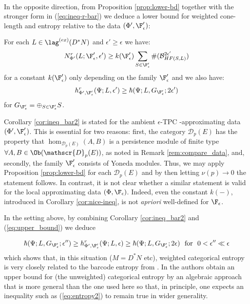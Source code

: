 \

In the opposite direction, from Proposition \ref{prop:lower-bd}  together with the stronger form in (\ref{eq:ineq-r-bar}) we deduce a lower bound for weighted cone-length and entropy relative to the data $(\Phi',\F'_{\epsilon})$:

\begin{cor} \label{cor:ineq_bar2} For each $L\in \lag^{(ex)}(D^{\ast}N)$ and $\epsilon'\geq \epsilon$ we 
have:
$$N^{r}_{\Phi'}(L;\F'_{\epsilon},\epsilon')\geq k(\F'_{\epsilon}) \sum_{S\in \F'_{\epsilon}} \#(\mathcal{B}^{2\epsilon'}_{HF(S,L)})$$
for a constant $k(\F'_{\epsilon})$  only depending on the family $\F'_{\epsilon}$ and we also have:
$$h^{r}_{\Phi',\F'_{\epsilon}}(\Psi; L ,\epsilon')\geq  \hbar(\Psi; L, G_{\F'_{\epsilon}}; 2\epsilon')$$ 
for $G_{\F'_{\epsilon}}=\oplus_{S\in \F'_{\epsilon}} S$.
\end{cor}
Corollary \ref{cor:ineq_bar2} is stated for the ambient $\epsilon$-TPC -approximating data $(\Phi',\F'_{\epsilon})$. This is essential for two reasons: first, the category  $\mathscr{D}_{p}(E)$ has the property that $\hom_{\mathscr{D}_{p}(E)}(A,B)$ is a persistence module of finite type $\forall A, B\in \Ob (\mathscr{D}_{p}(E))$, as noted in Remark  \ref{rem:compare_data}, and, secondly, the family $\F'_{\epsilon}$ consists of Yoneda modules. Thus, we may apply 
Proposition \ref{prop:lower-bd} for each $\mathscr{D}_{p}(E)$ 
and by then letting $\nu(p)\to 0$ the statement follows. In contrast,  it is not clear whether a similar statement is valid
for the local approximating data $(\Phi, \F_{\epsilon})$. Indeed, even the constant $k(-)$, introduced in Corollary \ref{cor:nice-ineq}, is not {\em apriori} well-defined for $\F_{\epsilon}$. 

\begin{rem}\label{rem:entrop_bars}
In the setting above,  by combining  Corollary \ref{cor:ineq_bar2}
and (\ref{eq:upper_bound}) we deduce

\begin{equation}\label{eq:entropy2}\hbar(\Psi; L, G_{\F'_{\epsilon}}; \epsilon'') \geq h^{r}_{\Phi',\F'_{\epsilon}}(\Psi; L ,\epsilon) \geq 
\hbar(\Psi; L, G_{\F'_{\epsilon}}; 2\epsilon) \ \  \mathrm{for\ }\ 0<\epsilon'' \ll \epsilon
\end{equation}
which shows that, in this situation ($M=D^{\ast}N$ etc),  weighted categorical entropy is very closely related to the barcode entropy from \cite{CGG_bar_ent}.  In \cite{DHKK:dyn_cat} the authors obtain an upper bound for (the unweighted) categorical entropy by an algebraic approach that is  more general than the one used here so that, in principle, one expects an inequality such as (\ref{eq:entropy2}) to remain true in
wider generality.
\end{rem}


